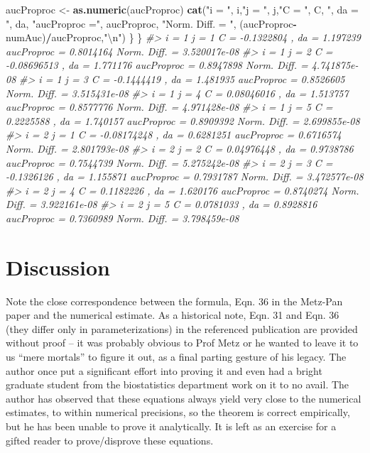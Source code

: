 \documentclass[
]{book}
\newenvironment{Shaded}{\begin{snugshade}}{\end{snugshade}}
\newcommand{\CharTok}[1]{\textcolor[rgb]{0.31,0.60,0.02}{#1}}
\newcommand{\CommentTok}[1]{\textcolor[rgb]{0.56,0.35,0.01}{\textit{#1}}}
\newcommand{\KeywordTok}[1]{\textcolor[rgb]{0.13,0.29,0.53}{\textbf{#1}}}
\newcommand{\NormalTok}[1]{#1}
\newcommand{\OperatorTok}[1]{\textcolor[rgb]{0.81,0.36,0.00}{\textbf{#1}}}
\newcommand{\StringTok}[1]{\textcolor[rgb]{0.31,0.60,0.02}{#1}}
\begin{document}
\begin{Shaded}
\begin{Highlighting}[]
\NormalTok{    aucProproc <-}\StringTok{  }\KeywordTok{as.numeric}\NormalTok{(aucProproc)}
    \KeywordTok{cat}\NormalTok{(}\StringTok{"i = "}\NormalTok{, i,}\StringTok{"j = "}\NormalTok{, j,}\StringTok{"C = "}\NormalTok{, C, }\StringTok{", da = "}\NormalTok{, da, }\StringTok{"aucProproc ="}\NormalTok{, aucProproc, }\StringTok{"Norm. Diff. = "}\NormalTok{, (aucProproc}\OperatorTok{-}\NormalTok{numAuc)}\OperatorTok{/}\NormalTok{aucProproc,}\StringTok{"}\CharTok{\textbackslash{}n}\StringTok{"}\NormalTok{)}
\NormalTok{  \}}
\NormalTok{\}}
\CommentTok{#> i =  1 j =  1 C =  -0.1322804 , da =  1.197239 aucProproc = 0.8014164 Norm. Diff. =  3.520017e-08 }
\CommentTok{#> i =  1 j =  2 C =  -0.08696513 , da =  1.771176 aucProproc = 0.8947898 Norm. Diff. =  4.741875e-08 }
\CommentTok{#> i =  1 j =  3 C =  -0.1444419 , da =  1.481935 aucProproc = 0.8526605 Norm. Diff. =  3.515431e-08 }
\CommentTok{#> i =  1 j =  4 C =  0.08046016 , da =  1.513757 aucProproc = 0.8577776 Norm. Diff. =  4.971428e-08 }
\CommentTok{#> i =  1 j =  5 C =  0.2225588 , da =  1.740157 aucProproc = 0.8909392 Norm. Diff. =  2.699855e-08 }
\CommentTok{#> i =  2 j =  1 C =  -0.08174248 , da =  0.6281251 aucProproc = 0.6716574 Norm. Diff. =  2.801793e-08 }
\CommentTok{#> i =  2 j =  2 C =  0.04976448 , da =  0.9738786 aucProproc = 0.7544739 Norm. Diff. =  5.275242e-08 }
\CommentTok{#> i =  2 j =  3 C =  -0.1326126 , da =  1.155871 aucProproc = 0.7931787 Norm. Diff. =  3.472577e-08 }
\CommentTok{#> i =  2 j =  4 C =  0.1182226 , da =  1.620176 aucProproc = 0.8740274 Norm. Diff. =  3.922161e-08 }
\CommentTok{#> i =  2 j =  5 C =  0.0781033 , da =  0.8928816 aucProproc = 0.7360989 Norm. Diff. =  3.798459e-08}
\end{Highlighting}
\end{Shaded}

\hypertarget{discussion-1}{%
\section{Discussion}\label{discussion-1}}

Note the close correspondence between the formula, Eqn. 36 in the Metz-Pan paper and the numerical estimate. As a historical note, Eqn. 31 and Eqn. 36 (they differ only in parameterizations) in the referenced publication are provided without proof -- it was probably obvious to Prof Metz or he wanted to leave it to us ``mere mortals'' to figure it out, as a final parting gesture of his legacy. The author once put a significant effort into proving it and even had a bright graduate student from the biostatistics department work on it to no avail. The author has observed that these equations always yield very close to the numerical estimates, to within numerical precisions, so the theorem is correct empirically, but he has been unable to prove it analytically. It is left as an exercise for a gifted reader to prove/disprove these equations.
\end{document}
